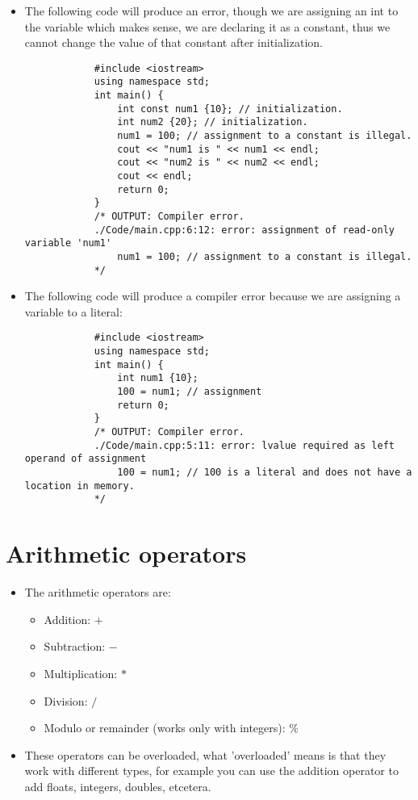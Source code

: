 \begin{itemize}
    \item The following code will produce an error, though we are assigning an int to the variable which makes sense, we are declaring it as a constant, thus we cannot change the value of that constant after initialization.
        \begin{verbatim}
            #include <iostream>
            using namespace std;
            int main() {
                int const num1 {10}; // initialization.
                int num2 {20}; // initialization.
                num1 = 100; // assignment to a constant is illegal.
                cout << "num1 is " << num1 << endl;
                cout << "num2 is " << num2 << endl;
                cout << endl;
                return 0;
            } 
            /* OUTPUT: Compiler error.
            ./Code/main.cpp:6:12: error: assignment of read-only variable 'num1'
                num1 = 100; // assignment to a constant is illegal.
            */
        \end{verbatim}
    
    \item The following code will produce a compiler error because we are assigning a variable to a literal:
        \begin{verbatim}
            #include <iostream>
            using namespace std;
            int main() {
                int num1 {10};
                100 = num1; // assignment
                return 0;
            }
            /* OUTPUT: Compiler error.
            ./Code/main.cpp:5:11: error: lvalue required as left operand of assignment
                100 = num1; // 100 is a literal and does not have a location in memory.
            */
        \end{verbatim}
\end{itemize}


\section{Arithmetic operators}
\begin{itemize}
    \item The arithmetic operators are: 
        \begin{itemize}
            \item Addition: $+$ 
            \item Subtraction: $-$ 
            \item Multiplication: $*$ 
            \item Division: $/$ 
            \item Modulo or remainder (works only with integers): $\%$
        \end{itemize}
    
    \item These operators can be overloaded, what 'overloaded' means is that they work with different types, for example you can use the addition operator to add floats, integers, doubles, etcetera.
\end{itemize}

